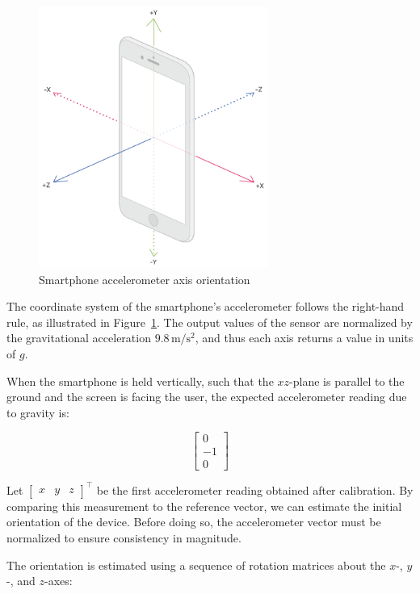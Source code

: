 \documentclass{article}
\begin{document}
\FloatBarrier
\begin{figure}[h]
    \centering
    \includegraphics[width=7.5cm]{Images/accelerometer.png}
    \caption{Smartphone accelerometer axis orientation}
    \label{fig:accelerometer}
\end{figure}

The coordinate system of the smartphone's accelerometer follows the right-hand rule, as illustrated in Figure~\ref{fig:accelerometer}. The output values of the sensor are normalized by the gravitational acceleration $9.8\,\mathrm{m/s^2}$, and thus each axis returns a value in units of $g$.

When the smartphone is held vertically, such that the $xz$-plane is parallel to the ground and the screen is facing the user, the expected accelerometer reading due to gravity is:

\[
\begin{bmatrix}
0\\
-1\\
0
\end{bmatrix}
\]

Let $\begin{bmatrix}x&y&z\end{bmatrix}^\top$ be the first accelerometer reading obtained after calibration. By comparing this measurement to the reference vector, we can estimate the initial orientation of the device. Before doing so, the accelerometer vector must be normalized to ensure consistency in magnitude.

The orientation is estimated using a sequence of rotation matrices about the $x$-, $y$-, and $z$-axes:
\end{document}
